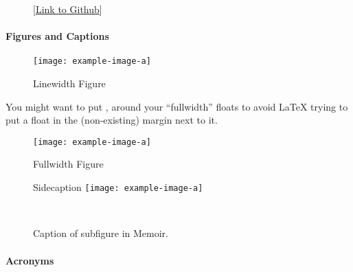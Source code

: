 \blockmargin
\begin{figure}[th]
\begin{fullwidthfig}
[\url{Link to Github}]
\end{fullwidthfig}
\end{figure}
\unblockmargin

\FloatBarrier
\paragraph{Figures and Captions}

\begin{figure}
	\texttt{[image: example-image-a]}
	\caption{Linewidth Figure}
	\label{LABEL1}
\end{figure}

You might want to put \detokenize{\blockmargin}, \detokenize{\unblockmargin} around your ``fullwidth'' floats to avoid LaTeX trying to put a float in the (non-existing) margin next to it. 

\blockmargin
\begin{figure}
	\begin{fullwidthfig}
	\texttt{[image: example-image-a]}
	\caption{Fullwidth Figure}
	\label{LABEL2}
	\end{fullwidthfig}
\end{figure}
\unblockmargin


\begin{figure}
	\begin{sidecaption}{Sidecaption}
		\texttt{[image: example-image-a]}
		\label{LABEL3}
	\end{sidecaption}
\end{figure}

\begin{figure}
	\\%
    \caption{Caption of subfigure in Memoir.}
    \label{LABEL6}
\end{figure}


\FloatBarrier
\paragraph{Acronyms}

